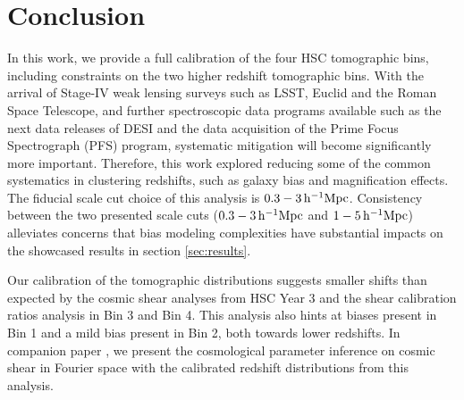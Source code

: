 \section{Conclusion}
\label{sec:conclusion}

In this work, we provide a full calibration of the four HSC tomographic bins, including constraints on the two higher redshift tomographic bins. 
With the arrival of Stage-IV weak lensing surveys such as LSST, Euclid and the Roman Space Telescope, and further spectroscopic data programs available such as the next data releases of DESI and the data acquisition of the Prime Focus Spectrograph (PFS) \cite{2016PFSspectro} program, systematic mitigation will become significantly more important. 
Therefore, this work explored reducing some of the common systematics in clustering redshifts, such as galaxy bias and magnification effects. 
The fiducial scale cut choice of this analysis is $0.3-3\,\mathrm{h}^{-1}\mathrm{Mpc}$. Consistency between the two presented scale cuts ($0.3-3\,\mathrm{h}^{-1}\mathrm{Mpc}$ and $1-5\,\mathrm{h}^{-1}\mathrm{Mpc}$) alleviates concerns that bias modeling complexities have substantial impacts on the showcased results in section \ref{sec:results}.


Our calibration of the tomographic distributions suggests smaller shifts than expected by the cosmic shear analyses from HSC Year 3 and the shear calibration ratios analysis in Bin 3 and Bin 4. 
This analysis also hints at biases present in Bin 1 and a mild bias present in Bin 2, both towards lower redshifts. 
In companion paper \cite{ChoppinDeJanvry2025b}, we present the cosmological parameter inference on cosmic shear in Fourier space with the calibrated redshift distributions from this analysis.

